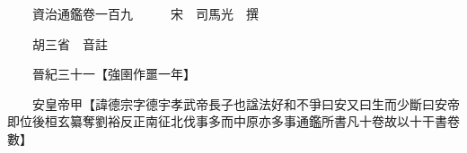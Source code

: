 










 


 
 


 

  
  
  
  
  





  
  
  
  
  
 
  

  

  
  
  



  

 
 

  
   




  

  
  


  　　資治通鑑卷一百九　　　宋　司馬光　撰

　　胡三省　音註

　　晉紀三十一【強圉作噩一年】

　　安皇帝甲【諱德宗字德宇孝武帝長子也諡法好和不爭曰安又曰生而少斷曰安帝即位後桓玄纂奪劉裕反正南征北伐事多而中原亦多事通鑑所書凡十卷故以十干書卷數】

